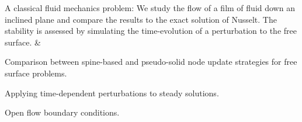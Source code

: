 \begin{longtabu}
A classical fluid mechanics problem\+: We study the flow of a film of fluid down an inclined plane and compare the results to the exact solution of Nusselt. The stability is assessed by simulating the time-\/evolution of a perturbation to the free surface.  &
\begin{DoxyItemize}
\item Comparison between spine-\/based and pseudo-\/solid node update strategies for free surface problems.
\item Applying time-\/dependent perturbations to steady solutions.
\item Open flow boundary conditions. 
\end{DoxyItemize}



\\
\end{longtabu}
\tabulinesep=1mm
